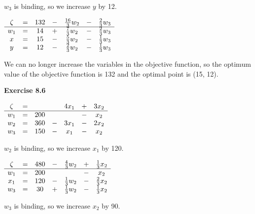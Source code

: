 \documentclass[letterpaper,12pt]{article}
\begin{document}
$w_3$ is binding, so we increase $y$ by 12. \\

\begin{center}
	$\begin{array}{ c c c c c c c c  }
	\zeta & = & 132 & - & \tfrac{16}{3}w_2 & - & \tfrac{2}{3}w_3 \\
	\hline
	w_1 & = & 14 & + & \tfrac{7}{3}w_2 & - & \tfrac{2}{3}w_3 \\
	x & = & 15 & - & \tfrac{5}{3}w_2 & - & \tfrac{1}{3}w_3 \\
	y & = & 12 & - & \tfrac{2}{3}w_2 & - & \tfrac{1}{3}w_3\\
	\end{array}$
\end{center}

We can no longer increase the variables in the objective function, so the optimum value of the objective function is 132 and the optimal point is (15, 12).

\textbf{Exercise 8.6}


\begin{center}
	$\begin{array}{ c c c c c c c c  }
	\zeta & = & & & 4x_1 & + & 3x_2 \\
	\hline
	w_1 & = & 200 & & & - & x_2 \\
	w_2 & = & 360 & - & 3x_1 & - & 2x_2 \\
	w_3 & = & 150 & - & x_1 & - & x_2 \\
	\end{array}$ \\
\end{center}

$w_2$ is binding, so we increase $x_1$ by 120. \\

\begin{center}
	$\begin{array}{ c c c c c c c c  }
	\zeta & = & 480 & - & \frac{4}{3}w_2 & + & \frac{1}{3}x_2 \\
	\hline
	w_1 & = & 200 & & & - & x_2 \\
	x_1 & = & 120 & - & \frac{1}{3}w_2 & - & \frac{2}{3}x_2 \\
	w_3 & = & 30 & + & \frac{1}{3}w_2 & - & \frac{1}{3}x_2 \\
	\end{array}$ \\
\end{center}

$w_3$ is binding, so we increase $x_2$ by 90. \\
\end{document}
